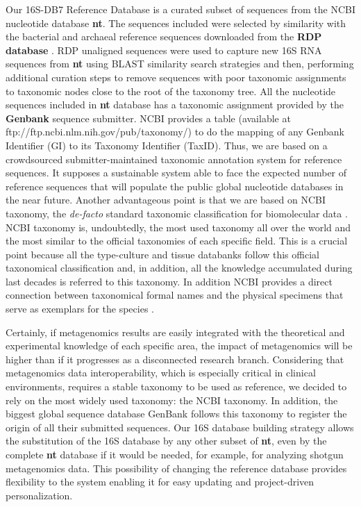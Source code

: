 \documentclass[fleqn,10pt,lineno]{wlpeerj}
\begin{document}
Our 16S-DB7 Reference Database is a curated subset of sequences from the
NCBI nucleotide database \textbf{nt}. The sequences included were
selected by similarity with the bacterial and archaeal reference
sequences downloaded from the \textbf{RDP database}
\citep{cole2013ribosomal}. RDP unaligned sequences were used to capture
new 16S RNA sequences from \textbf{nt} using BLAST similarity search
strategies and then, performing additional curation steps to remove
sequences with poor taxonomic assignments to taxonomic nodes close to
the root of the taxonomy tree. All the nucleotide sequences included in
\textbf{nt} database has a taxonomic assignment provided by the
\textbf{Genbank} sequence submitter. NCBI provides a table (available at
ftp://ftp.ncbi.nlm.nih.gov/pub/taxonomy/) to do the mapping of any
Genbank Identifier (GI) to its Taxonomy Identifier (TaxID). Thus, we are
based on a crowdsourced submitter-maintained taxonomic annotation system
for reference sequences. It supposes a sustainable system able to face
the expected number of reference sequences that will populate the public
global nucleotide databases in the near future. Another advantageous
point is that we are based on NCBI taxonomy, the \emph{de-facto}
standard taxonomic classification for biomolecular data
\citep{cochrane20102010}. NCBI taxonomy is, undoubtedly, the most used
taxonomy all over the world and the most similar to the official
taxonomies of each specific field. This is a crucial point because all
the type-culture and tissue databanks follow this official taxonomical
classification and, in addition, all the knowledge accumulated during
last decades is referred to this taxonomy. In addition NCBI provides a
direct connection between taxonomical formal names and the physical
specimens that serve as exemplars for the species
\citep{federhen2014type}.

Certainly, if metagenomics results are easily integrated with the
theoretical and experimental knowledge of each specific area, the impact
of metagenomics will be higher than if it progresses as a disconnected
research branch. Considering that metagenomics data interoperability,
which is especially critical in clinical environments, requires a stable
taxonomy to be used as reference, we decided to rely on the most widely
used taxonomy: the NCBI taxonomy. In addition, the biggest global
sequence database GenBank follows this taxonomy to register the origin
of all their submitted sequences. Our 16S database building strategy
allows the substitution of the 16S database by any other subset of
\textbf{nt}, even by the complete \textbf{nt} database if it would be
needed, for example, for analyzing shotgun metagenomics data. This
possibility of changing the reference database provides flexibility to
the system enabling it for easy updating and project-driven
personalization.
\end{document}
